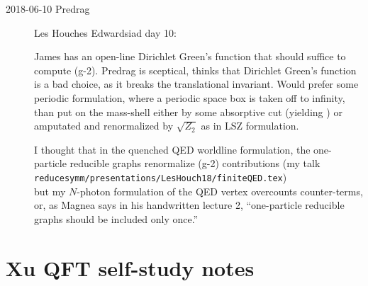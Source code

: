 \begin{description}
\item[2018-06-10 Predrag] Les Houches Edwardsiad day 10:

James has an open-line Dirichlet Green's function that should suffice
to compute (g-2). Predrag is sceptical, thinks that Dirichlet Green's function
is a bad choice, as it breaks the translational invariant. Would prefer
some periodic formulation, where a periodic space box is taken off to
infinity, than put on the mass-shell either by some absorptive cut
(yielding ) or amputated and renormalized by
$\sqrt{Z_2}$ as in LSZ formulation.

I thought that in the quenched QED worldline formulation, the
one-particle reducible graphs renormalize (g-2) contributions (my talk\\
\texttt{reducesymm/presentations/LesHouch18/finiteQED.tex}) \\
but my $N$-photon formulation of the QED vertex overcounts counter-terms,
or, as Magnea says in his handwritten
 {lecture 2},
``one-particle reducible graphs should be included only once.''


\end{description}


\section{Xu QFT self-study notes}
\label{c-dailyBlogAC}

